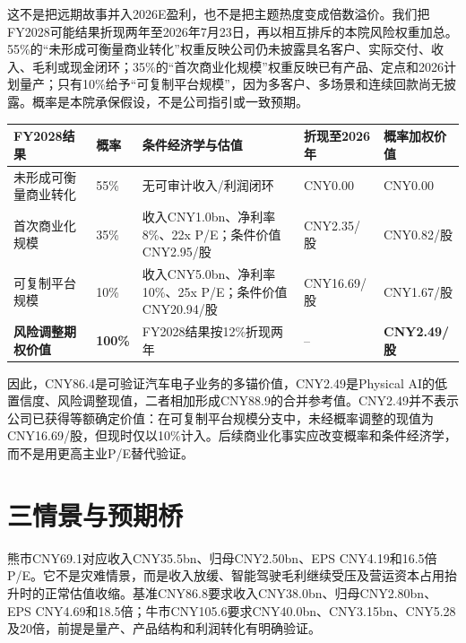 这不是把远期故事并入2026E盈利，也不是把主题热度变成倍数溢价。我们把FY2028可能结果折现两年至2026年7月23日，再以相互排斥的本院风险权重加总。55\%的“未形成可衡量商业转化”权重反映公司仍未披露具名客户、实际交付、收入、毛利或现金闭环；35\%的“首次商业化规模”权重反映已有产品、定点和2026计划量产；只有10\%给予“可复制平台规模”，因为多客户、多场景和连续回款尚无披露。概率是本院承保假设，不是公司指引或一致预期。

\begin{exhibitbox}
\small
\begin{tabularx}{\textwidth}{L{2.55cm}Y Y Y Y}
\toprule
FY2028结果 & 概率 & 条件经济学与估值 & 折现至2026年 & 概率加权价值 \\
\midrule
未形成可衡量商业转化 & 55\% & 无可审计收入/利润闭环 & CNY0.00 & CNY0.00 \\
首次商业化规模 & 35\% & 收入CNY1.0bn、净利率8\%、22x P/E；条件价值CNY2.95/股 & CNY2.35/股 & CNY0.82/股 \\
可复制平台规模 & 10\% & 收入CNY5.0bn、净利率10\%、25x P/E；条件价值CNY20.94/股 & CNY16.69/股 & CNY1.67/股 \\
\midrule
\textbf{风险调整期权价值} & \textbf{100\%} & FY2028结果按12\%折现两年 & -- & \textbf{CNY2.49/股} \\
\bottomrule
\end{tabularx}
\end{exhibitbox}

因此，CNY86.4是可验证汽车电子业务的多锚价值，CNY2.49是Physical AI的低置信度、风险调整现值，二者相加形成CNY88.9的合并参考值。CNY2.49并不表示公司已获得等额确定价值：在可复制平台规模分支中，未经概率调整的现值为CNY16.69/股，但现时仅以10\%计入。后续商业化事实应改变概率和条件经济学，而不是用更高主业P/E替代验证。

\section{三情景与预期桥}

熊市CNY69.1对应收入CNY35.5bn、归母CNY2.50bn、EPS CNY4.19和16.5倍P/E。它不是灾难情景，而是收入放缓、智能驾驶毛利继续受压及营运资本占用抬升时的正常估值收缩。基准CNY86.8要求收入CNY38.0bn、归母CNY2.80bn、EPS CNY4.69和18.5倍；牛市CNY105.6要求CNY40.0bn、CNY3.15bn、CNY5.28及20倍，前提是量产、产品结构和利润转化有明确验证。

